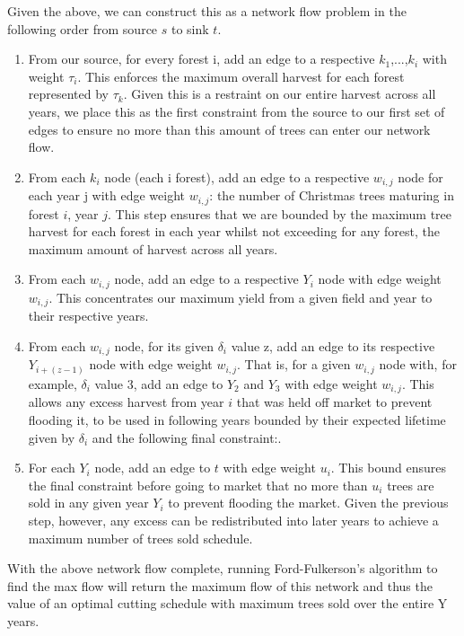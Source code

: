 \documentclass[11pt, oneside]{article}   	%
\begin{document}
\begin{enumerate}
\begin{enumerate}
	Given the above, we can construct this as a network flow problem in the following order from source $s$ to sink $t$.
	\begin{enumerate}
	\item From our source, for every forest i, add an edge to a respective $k_1$,...,$k_i$ with weight $\tau_i$. This enforces the maximum overall harvest for each forest represented by $\tau_k$. Given this is a restraint on our entire harvest across all years, we place this as the first constraint from the source to our first set of edges to ensure no more than this amount of trees can enter our network flow.
	\item From each $k_i$ node (each i forest), add an edge to a respective $w_{i,j}$ node for each year j with edge weight $w_{i,j}$: the number of Christmas trees maturing in forest $i$, year $j$. This step ensures that we are bounded by the maximum tree harvest for each forest in each year whilst not exceeding for any forest, the maximum amount of harvest across all years.
	\item From each $w_{i,j}$ node, add an edge to a respective $Y_i$ node with edge weight $w_{i,j}$. This concentrates our maximum yield from a given field and year to their respective years.
	\item From each $w_{i,j}$ node, for its given $\delta_i$ value z, add an edge to its respective $Y_{i+(z-1)}$ node with edge weight $w_{i,j}$. That is, for a given $w_{i,j}$ node with, for example, $\delta_i$ value 3, add an edge to $Y_2$ and $Y_3$ with edge weight $w_{i,j}$. This allows any excess harvest from year $i$ that was held off market to prevent flooding it, to be used in following years bounded by their expected lifetime given by $\delta_i$ and the following final constraint:.
	\item For each $Y_i$ node, add an edge to $t$ with edge weight $u_i$. This bound ensures the final constraint before going to market that no more than $u_i$ trees are sold in any given year $Y_i$ to prevent flooding the market. Given the previous step, however, any excess can be redistributed into later years to achieve a maximum number of trees sold schedule.
	\end{enumerate}
	With the above network flow complete, running Ford-Fulkerson's algorithm to find the max flow will return the maximum flow of this network and thus the value of an optimal cutting schedule with maximum trees sold over the entire Y years.
	

\end{enumerate}
\end{enumerate}
\end{document}

